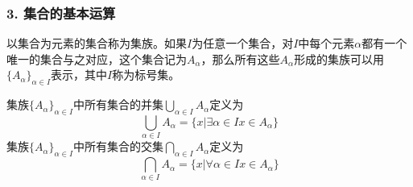 \documentclass{beamer}
\begin{document}
\begin{CJK*}{UTF8}{gbsn}


\begin{frame}
  \frametitle{3. 集合的基本运算}
  \begin{Def}  \justifying\let\raggedright\justifying
    以集合为元素的集合称为\alert{集族}。如果$I$为任意一个集合，对$I$中每个元素$\alpha$都有一个唯一的集合与之对应，这个集合记为$A_{\alpha}$，那么所有这些$A_{\alpha}$形成的集族可以用$\{A_{\alpha}\}_{\alpha \in I}$表示，其中$I$称为\alert{标号集}。
  \end{Def}
  \begin{Def}
    集族$\{A_{\alpha}\}_{\alpha \in I}$中所有集合的并集$\bigcup_{\alpha \in I}A_{\alpha}$定义为
\[ \bigcup_{\alpha \in I}A_{\alpha} = \{x|\exists \alpha \in I  x \in A_{\alpha}\}\]
    集族$\{A_{\alpha}\}_{\alpha \in I}$中所有集合的交集$\bigcap_{\alpha \in I}A_{\alpha}$定义为
\[ \bigcap_{\alpha \in I}A_{\alpha} = \{x|\forall \alpha \in I x \in A_{\alpha}\}\]
  \end{Def}
\end{frame}


\end{CJK*}
\end{document}
